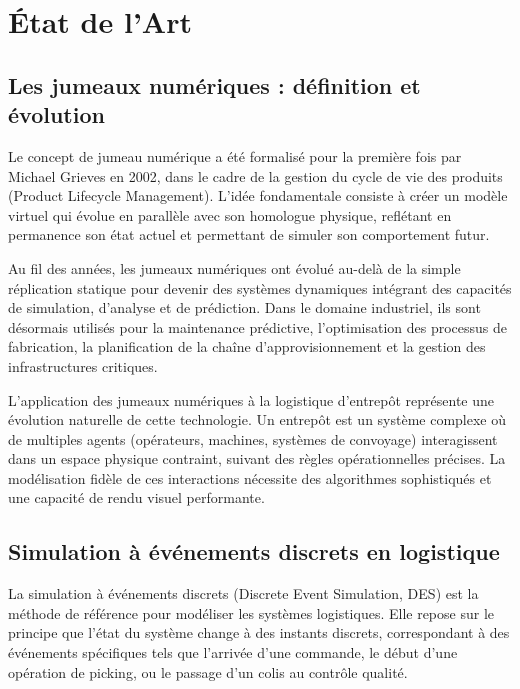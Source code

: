 \documentclass[12pt,a4paper]{report}
\begin{document}
\chapter{\'Etat de l'Art}

\section{Les jumeaux num\'eriques : d\'efinition et \'evolution}

Le concept de jumeau num\'erique a \'et\'e formalis\'e pour la premi\`ere fois par Michael Grieves en 2002, dans le cadre de la gestion du cycle de vie des produits (Product Lifecycle Management). L'id\'ee fondamentale consiste \`a cr\'eer un mod\`ele virtuel qui \'evolue en parall\`ele avec son homologue physique, refl\'etant en permanence son \'etat actuel et permettant de simuler son comportement futur.

Au fil des ann\'ees, les jumeaux num\'eriques ont \'evolu\'e au-del\`a de la simple r\'eplication statique pour devenir des syst\`emes dynamiques int\'egrant des capacit\'es de simulation, d'analyse et de pr\'ediction. Dans le domaine industriel, ils sont d\'esormais utilis\'es pour la maintenance pr\'edictive, l'optimisation des processus de fabrication, la planification de la cha\^ine d'approvisionnement et la gestion des infrastructures critiques.

L'application des jumeaux num\'eriques \`a la logistique d'entrep\^ot repr\'esente une \'evolution naturelle de cette technologie. Un entrep\^ot est un syst\`eme complexe o\`u de multiples agents (op\'erateurs, machines, syst\`emes de convoyage) interagissent dans un espace physique contraint, suivant des r\`egles op\'erationnelles pr\'ecises. La mod\'elisation fid\`ele de ces interactions n\'ecessite des algorithmes sophistiqu\'es et une capacit\'e de rendu visuel performante.

\section{Simulation \`a \'ev\'enements discrets en logistique}

La simulation \`a \'ev\'enements discrets (Discrete Event Simulation, DES) est la m\'ethode de r\'ef\'erence pour mod\'eliser les syst\`emes logistiques. Elle repose sur le principe que l'\'etat du syst\`eme change \`a des instants discrets, correspondant \`a des \'ev\'enements sp\'ecifiques tels que l'arriv\'ee d'une commande, le d\'ebut d'une op\'eration de picking, ou le passage d'un colis au contr\^ole qualit\'e.
\end{document}
